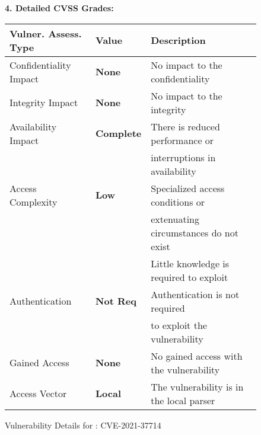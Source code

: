 \begin{figure}[t]
\begin{flushleft}
{\bf 4. Detailed CVSS Grades:}\\
\end{flushleft}
  \centering
  \tabcolsep 3pt
  \footnotesize
  \begin{tabular}{lll}
   Vulner. Assess. Type   & Value & Description \\
      \hline
    Confidentiality Impact & {\bf None}  & No impact to the confidentiality \\
    Integrity Impact & {\bf None}  & No impact to the integrity \\
    Availability Impact & {\bf Complete} & There is reduced performance or\\
    & & interruptions in availability\\
    Access Complexity & {\bf Low} & Specialized access conditions or \\
    & & extenuating circumstances do not exist\\
    & & Little knowledge is required to exploit\\
    Authentication & {\bf Not Req} & Authentication is not required \\
    & & to exploit the vulnerability\\
    Gained Access & {\bf None}  & No gained access with the vulnerability \\
    Access Vector & {\bf Local} & The vulnerability is in the local parser \\
    \end{tabular}%
  \vspace{-8pt}
\caption{Vulnerability Details for : CVE-2021-37714}
\label{CVSS-tab}
\end{figure}

